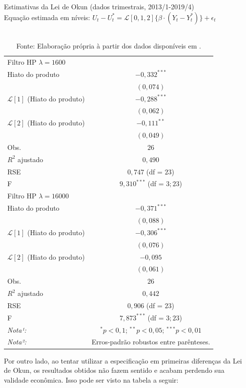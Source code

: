 \documentclass[12pt, openright,oneside, a4paper, english, brazil, section = TITLE, ubsection = Title]{article}
\begin{document}
\begin{table}[H]
\centering
\caption{Estimativas da Lei de Okun (dados trimestrais, 2013/1-2019/4) \\
\quad Equação estimada em níveis: $U_t - U_t^* = \mathcal{L}[0,1,2]\{\beta \cdot (Y_t - Y_t^*)\}  + \epsilon_t$}
\label{tab:okun_nivel}
\begin{tabular}{lc} \\ \toprule
Filtro HP $\lambda = 1600$ &  \\
Hiato do produto & $-0,332^{***}$ \\
 & $(0,074)$ \\
$\mathcal{L}[1]$ (Hiato do produto) & $-0,288^{***}$ \\ & $(0,062)$  \\ 
$\mathcal{L}[2]$ (Hiato do produto) & $-0,111^{**}$ \\ & $(0,049)$ \\
Obs. & $26$ \\
$R^2$ ajustado & $0,490$ \\
RSE & $0,747$ (df = $23$) \\ F & $9,310^{***}$ (df = $3;23$) \\ \midrule
Filtro HP $\lambda = 16000$ &  \\
Hiato do produto & $-0,371^{***}$ \\
 & $(0,088)$ \\
$\mathcal{L}[1]$ (Hiato do produto) & $-0,306^{***}$  \\ & $(0,076)$  \\ 
$\mathcal{L}[2]$ (Hiato do produto) & $-0,095$ \\ & $(0,061)$  \\
Obs. & $26$ \\
$R^2$ ajustado & $0,442$ \\
RSE & $0,906$ (df = $23$) \\ F & $7,873^{***}$ (df = $3;23$) \\ \bottomrule
\textit{Nota¹:} & $^*p < 0,1$; $^{**}p < 0,05$; $^{***}p < 0,01$ \\
\textit{Nota²:} & Erros-padrão robustos entre parênteses.
\end{tabular}
\caption*{\\ Fonte: Elaboração própria à partir dos dados disponíveis em \cite{IPEA2020}.}
\end{table}

Por outro lado, ao tentar utilizar a especificação em primeiras diferenças da Lei de Okun, os resultados obtidos não fazem sentido e acabam perdendo sua validade econômica. Isso pode ser visto na tabela a seguir:
\end{document}
